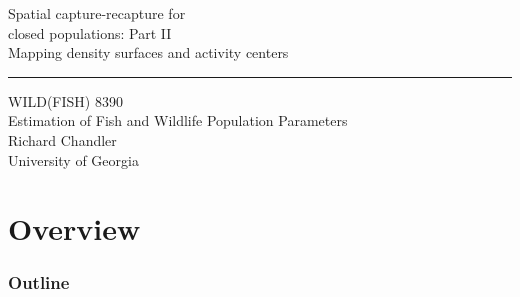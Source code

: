 \documentclass[color=usenames,dvipsnames]{beamer}\usepackage[]{graphicx}\usepackage[]{color}
\begin{document}
\begin{frame}[plain]
  \LARGE
  \centering
  {
    \LARGE Spatial capture-recapture for \\
    closed populations: Part II \\
    \Large Mapping density surfaces and activity centers \\
  }
  {\color{default} \rule{\textwidth}{0.1pt} }
  \vfill
  \large
  WILD(FISH) 8390 \\
  Estimation of Fish and Wildlife Population Parameters \\
  \vfill
  \large
  Richard Chandler \\
  University of Georgia \\
\end{frame}






\section{Overview}



\begin{frame}[plain]
  \frametitle{Outline}
  \Large
\end{frame}




\end{document}
